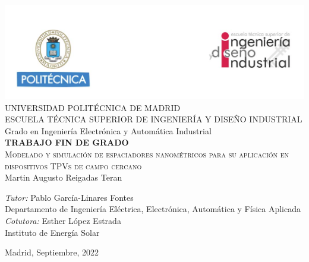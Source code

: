 \begin{titlepage}
\begin{center}
\includegraphics[width=1\textwidth]{figuras/cabecera.png}  \\[0.5 cm]

\LARGE UNIVERSIDAD POLITÉCNICA DE MADRID \\ [1 cm]

\LARGE ESCUELA TÉCNICA SUPERIOR DE INGENIERÍA Y DISEÑO INDUSTRIAL \\ [1 cm]

\LARGE Grado en Ingeniería Electrónica y Automática Industrial\\ [1 cm]

\LARGE \textbf{TRABAJO FIN DE GRADO}\\[0.75 cm]

\Huge \textsc{Modelado y simulación de espaciadores nanométricos para su aplicación en dispositivos TPVs de campo cercano}\\[1 cm]

\LARGE Martin Augusto Reigadas Teran \\[0.5 cm]
\begin{flushleft}
\Large
\emph{Tutor:} {Pablo García-Linares Fontes}\\
Departamento de Ingeniería Eléctrica, Electrónica, Automática y Física Aplicada\\
\emph{Cotutora:} Esther López Estrada\\
Instituto de Energía Solar\\
\end{flushleft}

\vfill

{\large Madrid, Septiembre, 2022}
\cleardoublepage 
\end{center}
\end{titlepage}
